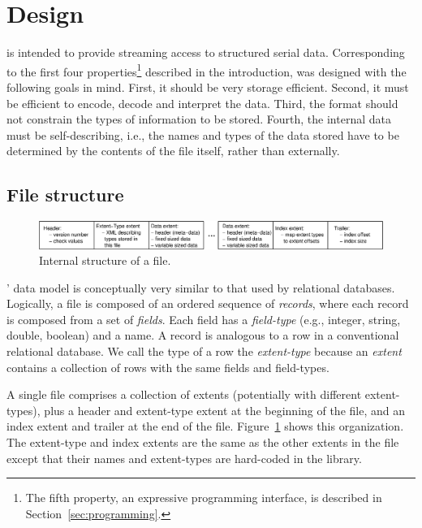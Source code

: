 \section{Design}\label{sec:design}

\DataSeries{} is intended to provide streaming access to structured serial
data. Corresponding
to the first four properties\footnote{The fifth property, an expressive
programming interface, is described in Section~\ref{sec:programming}.}
described in the introduction, \DataSeries{} was designed with the
following goals in mind. First, it should be very storage
efficient. Second, it must be efficient to encode, decode and
interpret the data.  Third, the format should not constrain the
types of information to be stored. Fourth, the internal data must be
self-describing, i.e., the names and types of the data stored have to
be determined by the contents of the file itself, rather than 
externally.

\subsection{File structure}\label{sec:structure}

\begin{figure}
\hfil\includegraphics[width=6.5in]{fig/ds-format2.eps}\hfil
\caption{Internal structure of a \DataSeries{} file. }
\label{fig:dsorg}
\end{figure}

\DataSeries{}' data model is conceptually very similar to that used
by relational databases. 
Logically, a \DataSeries{} file is composed of an ordered sequence of
{\it records}, where each record is composed from a set of {\it
fields}. Each field has a {\it field-type} (e.g., integer, string, double,
boolean) and a name. A \DataSeries{} record is analogous to a row in a
conventional relational database. We call the type of a row 
the {\it extent-type} because 
an {\it extent} contains a collection of rows with the same fields and 
field-types.

A single \DataSeries{} file comprises a
collection of extents (potentially with different extent-types), plus a
header and extent-type extent at the beginning of the file, and an index extent and
trailer at the end of the file. Figure~\ref{fig:dsorg} shows
this organization.  The extent-type and index extents are the same as the
other extents in the file except that their names and extent-types are 
hard-coded in the library.

